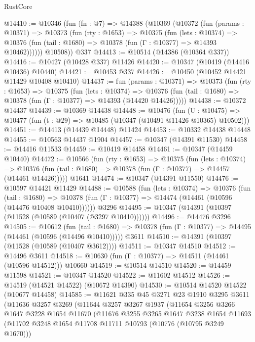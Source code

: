 \begin{lexlean}{RustCore}
\begin{coremodule}
@14410 := @10346
    (fun (fn : @7) =>
    @14388
      (@10369
        (@10372
          (fun (params : @10371) =>
          @10373
            (fun (rty : @1653) =>
            @10375
              (fun (lets : @10374) =>
              @10376 (fun (tail : @1680) => @10378 (fun (Γ : @10377) => @14393 @10462))))))
        @10508))
    @337
@14413 := @10514 (@14386 (@10364 @337))
@14416 := @10427 (@10428 @337) @11426
@14420 := @10347 (@10419 (@14416 @10436) @10440)
@14421 := @10453 @337
@14426 := @10450 (@10452 @14421 @11429 @10408 @10410)
@14437 := fun (params : @10371) =>
  @10373
    (fun (rty : @1653) =>
    @10375
      (fun (lets : @10374) =>
      @10376 (fun (tail : @1680) => @10378 (fun (Γ : @10377) => @14393 (@14420 @14426)))))
@14438 := @10372 @14437
@14439 := @10369 @14438
@14448 := @10476
    (fun (U : @10475) => @10477 (fun (t : @29) => @10485 (@10347 (@10491 @11426 @10365) @10502)))
@14451 := @14413 (@14439 @14448) @11424
@14453 := @10332 @14438 @14448
@14455 := @10563 @14437 @1904
@14457 := @10347 (@14391 @11530)
@14458 := @14416 @11533
@14459 := @10419 @14458
@14461 := @10347 (@14459 @10440)
@14472 := @10566
    (fun (rty : @1653) =>
    @10375
      (fun (lets : @10374) =>
      @10376 (fun (tail : @1680) => @10378 (fun (Γ : @10377) => @14457 (@14461 @14426)))))
    @1641
@14474 := @10347 (@14391 @11550)
@14476 := @10597 @14421 @11429
@14488 := @10588
    (fun (lets : @10374) =>
    @10376
      (fun (tail : @1680) =>
      @10378 (fun (Γ : @10377) => @14474 (@14461 (@10596 (@14476 @10408 @10410))))))
    @3296
@14495 := @10347 (@14391 (@10397 (@11528 (@10589 (@10407 (@3297 @10410))))))
@14496 := @14476 @3296
@14505 := @10612
    (fun (tail : @1680) => @10378 (fun (Γ : @10377) => @14495 (@14461 (@10596 (@14496 @10410)))))
    @3611
@14510 := @14391 (@10397 (@11528 (@10589 (@10407 @3612))))
@14511 := @10347 @14510
@14512 := @14496 @3611
@14518 := @10630 (fun (Γ : @10377) => @14511 (@14461 (@10596 @14512))) @10660
@14519 := @10514 @14510
@14520 := @14459 @11598
@14521 := @10347 @14520
@14522 := @11602 @14512
@14526 := @14519 (@14521 @14522) (@10672 @14390)
@14530 := @10514 @14520 @14522 (@10677 @14458)
@14585 := @11621
    @335
    @45
    @3271
    @23
    @1910
    @3295
    @3611
    (@11636
      @3257
      @3269
      (@11644
        @3257
        @3267
        @1937
        (@11654
          @3256
          @3266
          @1647
          @3228
          @1654
          @11670
          (@11676
            @3255
            @3265
            @1647
            @3238
            @1654
            @11693
            (@11702 @3248 @1654 @11708 @11711 @10793 (@10776 (@10795 @3249 @1670)))

\end{coremodule}
\end{lexlean}

